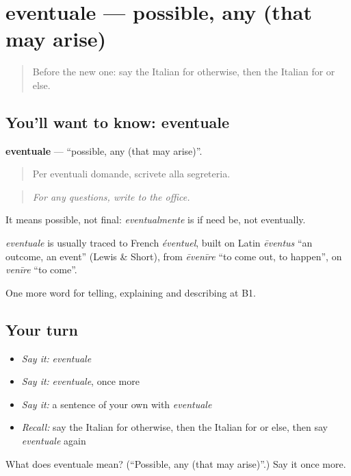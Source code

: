 \section[eventuale]{eventuale — possible, any (that may arise)}

\label{lesson:IT-C373-eventuale}



\begin{quote}
Before the new one: say the Italian for otherwise, then the Italian for or else.
\end{quote}

\subsection*{You'll want to know: eventuale}
\textbf{eventuale} — \textquotedblleft{}possible, any (that may arise)\textquotedblright{}.

\begin{quote}
Per eventuali domande, scrivete alla segreteria.
\end{quote}

\begin{quote}
\emph{For any questions, write to the office.}
\end{quote}

It means possible, not final: \emph{eventualmente} is if need be, not eventually.

\begin{cousinweb}
\emph{eventuale} is usually traced to French \emph{éventuel}, built on Latin \emph{ēventus} \textquotedblleft{}an outcome, an event\textquotedblright{} (Lewis \& Short), from \emph{ēvenīre} \textquotedblleft{}to come out, to happen\textquotedblright{}, on \emph{venīre} \textquotedblleft{}to come\textquotedblright{}.
\end{cousinweb}

\begin{grammarlens}[title={What you've built}]
One more word for telling, explaining and describing at B1.
\end{grammarlens}

\subsection*{Your turn}
\begin{itemize}
\raggedright
  \item \emph{Say it:} \emph{eventuale}
  \item \emph{Say it:} \emph{eventuale}, once more
  \item \emph{Say it:} a sentence of your own with \emph{eventuale}
  \item \emph{Recall:} say the Italian for otherwise, then the Italian for or else, then say \emph{eventuale} again
\end{itemize}

\begin{tcolorbox}[breakable,colback=teal!4,colframe=teal!35!black,title={Before you move on}]
What does eventuale mean? (\textquotedblleft{}Possible, any (that may arise)\textquotedblright{}.) Say it once more.
\end{tcolorbox}
